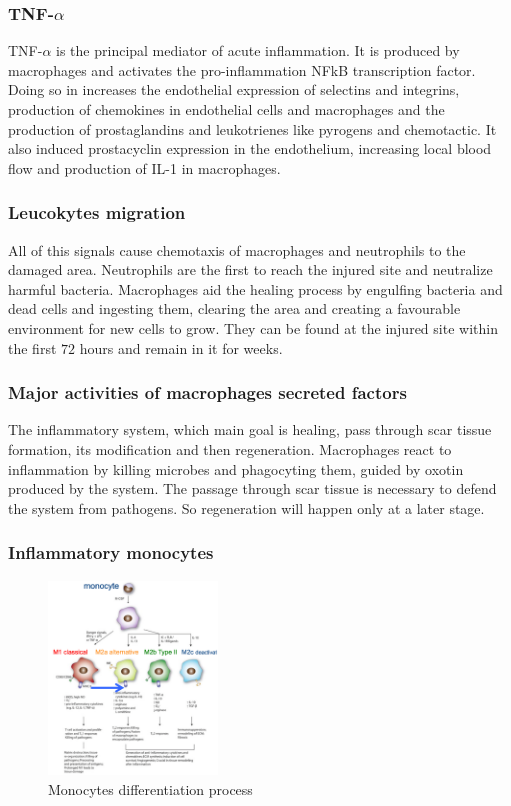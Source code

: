 		\subsubsection{TNF-$\alpha$}
		TNF-$\alpha$ is the principal mediator of acute inflammation.
		It is produced by macrophages and activates the pro-inflammation NFkB transcription factor.
		Doing so in increases the endothelial expression of selectins and integrins, production of chemokines in endothelial cells and macrophages and the production of prostaglandins and leukotrienes like pyrogens and chemotactic.
		It also induced prostacyclin expression in the endothelium, increasing local blood flow and production of IL-1 in macrophages.

		\subsubsection{Leucokytes migration}
		All of this signals cause chemotaxis of macrophages and neutrophils to the damaged area.
		Neutrophils are the first to reach the injured site and neutralize harmful bacteria.
		Macrophages aid the healing process by engulfing bacteria and dead cells and ingesting them, clearing the area and creating a favourable environment for new cells to grow.
		They can be found at the injured site within the first $72$ hours and remain in it for weeks.

		\subsubsection{Major activities of macrophages secreted factors}
		The inflammatory system, which main goal is healing, pass through scar tissue formation, its modification and then regeneration.
		Macrophages react to inflammation by killing microbes and phagocyting them, guided by oxotin produced by the system.
		The passage through scar tissue is necessary to defend the system from pathogens.
		So regeneration will happen only at a later stage.

		\subsubsection{Inflammatory monocytes}

		\begin{figure}[ht]
			\centering
			\includegraphics[width=0.4\textwidth]{mono_diff}
			\caption{Monocytes differentiation process}
			\label{fig:mono}
		\end{figure}


